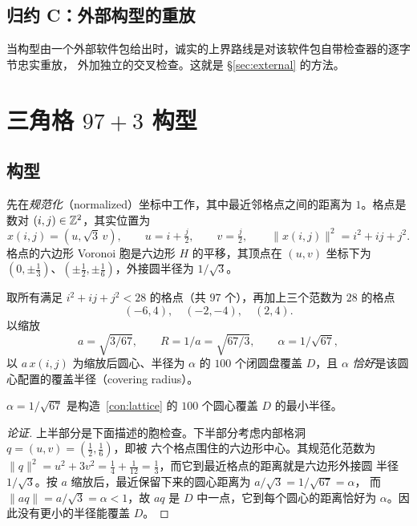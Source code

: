\subsection{归约 C：外部构型的重放}

当构型由一个外部软件包给出时，诚实的上界路线是对该软件包自带检查器的逐字节忠实重放，
外加独立的交叉检查。这就是 \S\ref{sec:external} 的方法。

\section{三角格 $97{+}3$ 构型}
\label{sec:lattice}

\subsection{构型}

先在\emph{规范化}（normalized）坐标中工作，其中最近邻格点之间的距离为 $1$。格点是数对
$(i,j)\in\mathbb{Z}^2$，其实位置为
\[
x(i,j)=(u,\sqrt3\,v),\qquad u=i+\tfrac j2,\qquad v=\tfrac j2,
\qquad
\|x(i,j)\|^2=i^2+ij+j^2 .
\]
格点的六边形 Voronoi 胞是六边形 $H$ 的平移，其顶点在 $(u,v)$ 坐标下为
$(0,\pm\frac13)$、$(\pm\frac12,\pm\frac16)$，外接圆半径为 $1/\sqrt3$。

\begin{construction}[$97{+}3$ 构型]\label{con:lattice}
取所有满足 $i^2+ij+j^2<28$ 的格点（共 $97$ 个），再加上三个范数为 $28$ 的格点
\[
(-6,4),\quad(-2,-4),\quad(2,4).
\]
以缩放
\[
a=\sqrt{3/67},\qquad R=1/a=\sqrt{67/3},\qquad \alpha=1/\sqrt{67},
\]
以 $a\,x(i,j)$ 为缩放后圆心、半径为 $\alpha$ 的 $100$ 个闭圆盘覆盖 $D$，且 $\alpha$
\emph{恰好}是该圆心配置的覆盖半径（covering radius）。
\end{construction}

\begin{proposition}[构型的精确覆盖半径]\label{prop:lattice-alpha}
$\alpha=1/\sqrt{67}$ 是构造~\ref{con:lattice} 的 $100$ 个圆心覆盖 $D$ 的最小半径。
\end{proposition}

\begin{proof}[论证]
上半部分是下面描述的胞检查。下半部分考虑内部格洞 $q=(u,v)=(\tfrac12,\tfrac16)$，即被
六个格点围住的六边形中心。其规范化范数为
$\|q\|^2=u^2+3v^2=\tfrac14+\tfrac1{12}=\tfrac13$，而它到最近格点的距离就是六边形外接圆
半径 $1/\sqrt3$。按 $a$ 缩放后，最近保留下来的圆心距离为 $a/\sqrt3=1/\sqrt{67}=\alpha$，
而 $\|a q\|=a/\sqrt3=\alpha<1$，故 $aq$ 是 $D$ 中一点，它到每个圆心的距离恰好为
$\alpha$。因此没有更小的半径能覆盖 $D$。
\end{proof}

